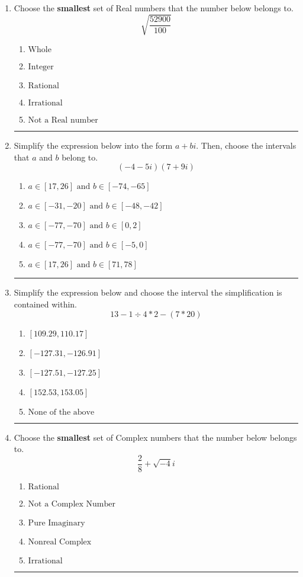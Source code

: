 \documentclass[14pt]{extbook}
\newcommand{\litem}[1]{\item#1\hspace*{-1cm}\rule{\textwidth}{0.4pt}}
\begin{document}
\begin{enumerate}
\litem{
Choose the \textbf{smallest} set of Real numbers that the number below belongs to.\[ \sqrt{\frac{52900}{100}} \]\begin{enumerate}[label=\Alph*.]
\item \( \text{Whole} \)
\item \( \text{Integer} \)
\item \( \text{Rational} \)
\item \( \text{Irrational} \)
\item \( \text{Not a Real number} \)

\end{enumerate} }
\litem{
Simplify the expression below into the form $a+bi$. Then, choose the intervals that $a$ and $b$ belong to.\[ (-4 - 5 i)(7 + 9 i) \]\begin{enumerate}[label=\Alph*.]
\item \( a \in [17, 26] \text{ and } b \in [-74, -65] \)
\item \( a \in [-31, -20] \text{ and } b \in [-48, -42] \)
\item \( a \in [-77, -70] \text{ and } b \in [0, 2] \)
\item \( a \in [-77, -70] \text{ and } b \in [-5, 0] \)
\item \( a \in [17, 26] \text{ and } b \in [71, 78] \)

\end{enumerate} }
\litem{
Simplify the expression below and choose the interval the simplification is contained within.\[ 13 - 1 \div 4 * 2 - (7 * 20) \]\begin{enumerate}[label=\Alph*.]
\item \( [109.29, 110.17] \)
\item \( [-127.31, -126.91] \)
\item \( [-127.51, -127.25] \)
\item \( [152.53, 153.05] \)
\item \( \text{None of the above} \)

\end{enumerate} }
\litem{
Choose the \textbf{smallest} set of Complex numbers that the number below belongs to.\[ \frac{2}{8}+\sqrt{-4}i \]\begin{enumerate}[label=\Alph*.]
\item \( \text{Rational} \)
\item \( \text{Not a Complex Number} \)
\item \( \text{Pure Imaginary} \)
\item \( \text{Nonreal Complex} \)
\item \( \text{Irrational} \)


\end{enumerate}}
\end{enumerate}
\end{document}
